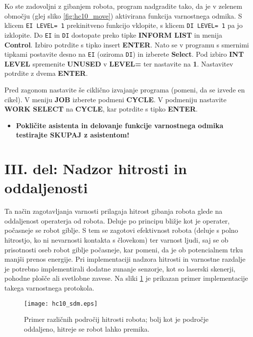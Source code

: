 Ko ste zadovoljni z gibanjem robota, program nadgradite tako, da je v zelenem območju (glej sliko \ref{fig:hc10_move}) aktivirana funkcija varnostnega odmika. S klicem \verb"EI LEVEL= 1" prekinitveno funkcijo vklopite, s klicem \verb"DI LEVEL= 1" pa jo izklopite. Do \verb"EI" in \verb"DI" dostopate preko tipke \textbf{INFORM LIST} in menija \textbf{Control}. Izbiro potrdite s tipko insert \textbf{ENTER}. Nato se v programu s smernimi tipkami postavite desno na \verb"EI" (oziroma \verb"DI") in izberete \textbf{Select}. Pod izbiro \textbf{INT LEVEL} spremenite \textbf{UNUSED} v \textbf{LEVEL=} ter nastavite na \textbf{1}. Nastavitev potrdite z dvema \textbf{ENTER}.

Pred zagonom nastavite še ciklično izvajanje programa (pomeni, da se izvede en cikel). V meniju \textbf{JOB} izberete podmeni \textbf{CYCLE}. V podmeniju nastavite \textbf{WORK SELECT} na \textbf{CYCLE}, kar potrdite s tipko \textbf{ENTER}.

\vspace{5mm}

\begin{mdframed}[backgroundcolor=red!20, shadow=true,roundcorner=8pt]
	\begin{itemize}
		\item \textbf{Pokličite asistenta in delovanje funkcije varnostnega odmika testirajte SKUPAJ z asistentom!}		
	\end{itemize}
\end{mdframed}


\section{III. del: Nadzor hitrosti in oddaljenosti}

Ta način zagotavljanja varnosti prilagaja hitrost gibanja robota glede na oddaljenost operaterja od robota. Deluje po principu bližje kot je operater, počasneje se robot giblje. S tem se zagotovi efektivnost robota (deluje s polno hitrostjo, ko ni nevarnosti kontakta s človekom) ter varnost ljudi, saj se ob prisotnosti oseb robot giblje počasneje, kar pomeni, da je ob potencialnem trku manjši prenos energije. Pri implementaciji nadzora hitrosti in varnostne razdalje je potrebno implementirali dodatne zunanje senzorje, kot so laserski skenerji, pohodne plošče ali svetlobne zavese. Na sliki \ref{fig:hc10_sdm} je prikazan primer implementacije takega varnostnega protokola.

\begin{figure}[!hbt]
	\centering
	\texttt{[image: hc10\_sdm.eps]}
	\caption{Primer različnih področij hitrosti robota; bolj kot je področje oddaljeno, hitreje se robot lahko premika.}
	\label{fig:hc10_sdm}
\end{figure}

